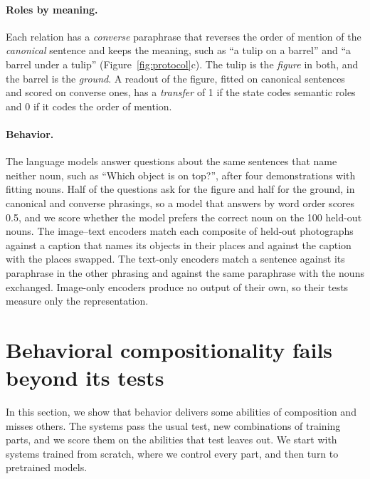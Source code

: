 \documentclass[10pt]{article}
\theoremstyle{plain}
\theoremstyle{remark}
\begin{document}
\paragraph{Roles by meaning.} Each relation has a \emph{converse} paraphrase that reverses the order of mention of the \emph{canonical} sentence and keeps the meaning, such as ``a tulip on a barrel'' and ``a barrel under a tulip'' (Figure~\ref{fig:protocol}c). The tulip is the \emph{figure} in both, and the barrel is the \emph{ground}. A readout of the figure, fitted on canonical sentences and scored on converse ones, has a \emph{transfer} of 1 if the state codes semantic roles and 0 if it codes the order of mention.

\paragraph{Behavior.} The language models answer questions about the same sentences that name neither noun, such as ``Which object is on top?'', after four demonstrations with fitting nouns. Half of the questions ask for the figure and half for the ground, in canonical and converse phrasings, so a model that answers by word order scores 0.5, and we score whether the model prefers the correct noun on the 100 held-out nouns. The image--text encoders match each composite of held-out photographs against a caption that names its objects in their places and against the caption with the places swapped. The text-only encoders match a sentence against its paraphrase in the other phrasing and against the same paraphrase with the nouns exchanged. Image-only encoders produce no output of their own, so their tests measure only the representation.

\section{Behavioral compositionality fails beyond its tests}
\label{sec:results}

In this section, we show that behavior delivers some abilities of composition and misses others. The systems pass the usual test, new combinations of training parts, and we score them on the abilities that test leaves out. We start with systems trained from scratch, where we control every part, and then turn to pretrained models.
\end{document}
